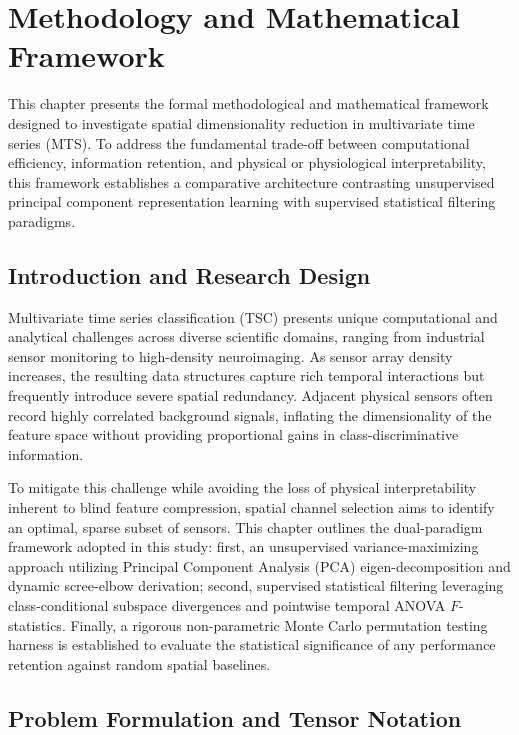 \chapter{Methodology and Mathematical Framework}
\label{ch:methodology}

\noindent
This chapter presents the formal methodological and mathematical framework designed to investigate spatial dimensionality reduction in multivariate time series (MTS). To address the fundamental trade-off between computational efficiency, information retention, and physical or physiological interpretability, this framework establishes a comparative architecture contrasting unsupervised principal component representation learning with supervised statistical filtering paradigms.

\section{Introduction and Research Design}
\label{sec:method_intro}

\noindent
Multivariate time series classification (TSC) presents unique computational and analytical challenges across diverse scientific domains, ranging from industrial sensor monitoring to high-density neuroimaging. As sensor array density increases, the resulting data structures capture rich temporal interactions but frequently introduce severe spatial redundancy. Adjacent physical sensors often record highly correlated background signals, inflating the dimensionality of the feature space without providing proportional gains in class-discriminative information. 

\noindent
To mitigate this challenge while avoiding the loss of physical interpretability inherent to blind feature compression, spatial channel selection aims to identify an optimal, sparse subset of sensors. This chapter outlines the dual-paradigm framework adopted in this study: first, an unsupervised variance-maximizing approach utilizing Principal Component Analysis (PCA) eigen-decomposition and dynamic scree-elbow derivation; second, supervised statistical filtering leveraging class-conditional subspace divergences and pointwise temporal ANOVA $F$-statistics. Finally, a rigorous non-parametric Monte Carlo permutation testing harness is established to evaluate the statistical significance of any performance retention against random spatial baselines.

\section{Problem Formulation and Tensor Notation}
\label{sec:problem_formulation}

